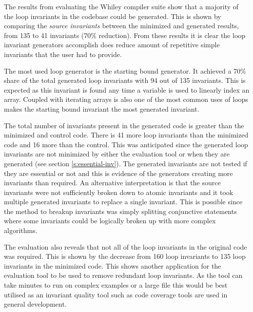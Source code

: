The results from evaluating the Whiley compiler suite show that a majority of
the loop invariants in the codebase could be generated.
This is shown by comparing the \textit{source invariants} between the
minimized and generated results, from 135 to 41 invariants (70\% reduction).
From these results it is clear the loop invariant generators accomplish does
reduce amount of repetitive simple invariants that the user had to provide.

The most used loop generator is the starting bound generator.
It achieved a 70\% share of the total generated loop invariants with 94 out of
135 invariants.
This is expected as this invariant is found any time a variable
is used to linearly index an array.
Coupled with iterating arrays is also one of the most common uses of loops
makes the starting bound invariant the most generated invariant.

The total number of invariants present in the generated code is greater
than the minimized and control code.
There is 41 more loop invariants than the minimized code and 16 more than the control.
This was anticipated since the generated loop invariants are not minimized by either
the evaluation tool or when they are generated (see section \ref{s:essential-inv}).
The generated invariants are not tested if they are essential or not and this is
evidence of the generators creating more invariants than required.
An alternative interpretation is that the source invariants were not sufficiently broken down to
atomic invariants and it took multiple generated invariants to replace a single invariant.
This is possible since the method to breakup invariants was simply splitting conjunctive statements
where some invariants could be logically broken up with more complex algorithms.

The evaluation also reveals that not all of the loop invariants in the original
code was required.
This is shown by the decrease from 160 loop invariants to 135 loop invariants
in the minimized code.
This shows another application for the evaluation tool to be used to remove redundant
loop invariants.
As the tool can take minutes to run on complex examples or a large file this
would be best utilised as an invariant quality tool such as code coverage tools
are used in general development.
